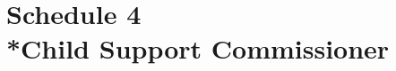 \documentclass[12pt,a4paper]{article}
\begin{document}
%
%
%
%
%
%
%
%
%
%
%
%

\part[Schedule 4 --- Child Support Commissioners]{Schedule 4\\*Child Support Commissioner}

\renewcommand\parthead{--- Schedule 4}
\end{document}
